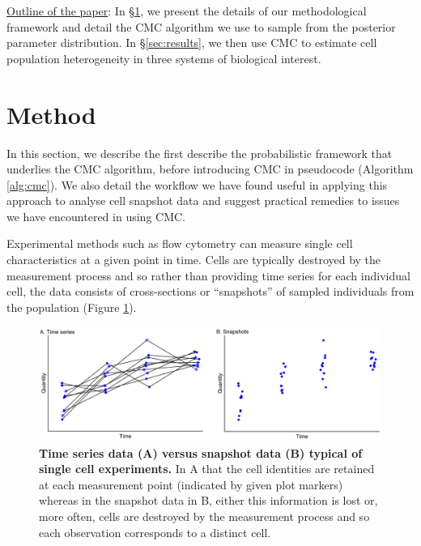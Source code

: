 \documentclass[10pt,letterpaper]{article}
\begin{document}
\underline{Outline of the paper}: In \S \ref{sec:method}, we present the details of our methodological framework and detail the CMC algorithm we use to sample from the posterior parameter distribution. In \S \ref{sec:results}, we then use CMC to estimate cell population heterogeneity in three systems of biological interest.

\section{Method}\label{sec:method}
In this section, we describe the first describe the probabilistic framework that underlies the CMC algorithm, before introducing CMC in pseudocode (Algorithm \ref{alg:cmc}). We also detail the workflow we have found useful in applying this approach to analyse cell snapshot data and suggest practical remedies to issues we have encountered in using CMC.

Experimental methods such as flow cytometry can measure single cell characteristics at a given point in time. Cells are typically destroyed by the measurement process and so rather than providing time series for each individual cell, the data consists of cross-sections or ``snapshots'' of sampled individuals from the population (Figure \ref{fig:time_series_v_snapshots}).

\begin{figure}[H]
	\centerline{\includegraphics[width=\textwidth]{../figures/time_series_v_snapshots.pdf}}
	\caption{\textbf{Time series data (A) versus snapshot data (B) typical of single cell experiments.} In A that the cell identities are retained at each measurement point (indicated by given plot markers) whereas in the snapshot data in B, either this information is lost or, more often, cells are destroyed by the measurement process and so each observation corresponds to a distinct cell.}
	\label{fig:time_series_v_snapshots}
\end{figure}
\end{document}
